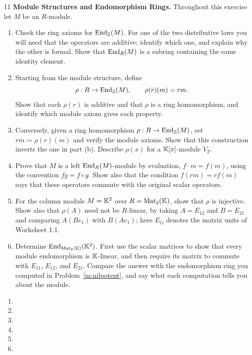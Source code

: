 \documentclass[Notebook.tex]{subfiles}
\begin{document}
\begin{problem}{11}\label{m:end}
	\textbf{Module Structures and Endomorphism Rings.} Throughout this exercise let $M$ be an $R$-module.
	\begin{enumerate}[label=(\alph*),ref=\theenumi\alph*]
		\item Check the ring axioms for $\operatorname{End}_{\mathbb Z}(M)$. For one of the two distributive laws you will need that the operators are additive; identify which one, and explain why the other is formal. Show that $\operatorname{End}_R(M)$ is a subring containing the same identity element.
		\item Starting from the module structure, define
		\[
		\rho:R\to\operatorname{End}_{\mathbb Z}(M),\qquad \rho(r)(m)=rm.
		\]
		Show that each $\rho(r)$ is additive and that $\rho$ is a ring homomorphism, and identify which module axiom gives each property.
		\item Conversely, given a ring homomorphism $\rho:R\to\operatorname{End}_{\mathbb Z}(M)$, set $rm\coloneqq\rho(r)(m)$ and verify the module axioms. Show that this construction inverts the one in part (b). Describe $\rho(x)$ for a $\mathbb K[x]$-module $V_T$.
		\item Prove that $M$ is a left $\operatorname{End}_R(M)$-module by evaluation, $f\cdot m=f(m)$, using the convention $fg=f\circ g$. Show also that the condition $f(rm)=rf(m)$ says that these operators commute with the original scalar operators.
		\item For the column module $M=\mathbb K^2$ over $R=\operatorname{Mat}_2(\mathbb K)$, show that $\rho$ is injective. Show also that $\rho(A)$ need not be $R$-linear, by taking $A=E_{12}$ and $B=E_{21}$ and comparing $A(Be_1)$ with $B(Ae_1)$; here $E_{ij}$ denotes the matrix units of Worksheet 1.1.
		\item Determine $\operatorname{End}_{\operatorname{Mat}_2(\mathbb K)}(\mathbb K^2)$. First use the scalar matrices to show that every module endomorphism is $\mathbb K$-linear, and then require its matrix to commute with $E_{11}$, $E_{12}$, and $E_{21}$. Compare the answer with the endomorphism ring you computed in Problem~\ref{m:nilpotent}, and say what each computation tells you about the module.
	\end{enumerate}
\end{problem}

\begin{solution}
	\bbni
	\begin{enumerate}[label=(\alph*),ref=\theenumi\alph*]
		\item
		\item
		\item
		\item
		\item
		\item
	\end{enumerate}
\end{solution}
\end{document}
